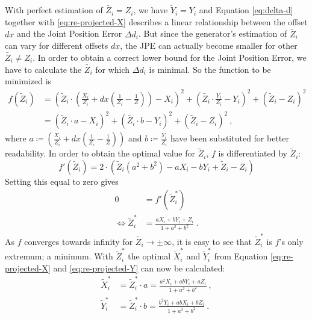 With perfect estimation of $\widetilde{Z_i} = Z_i$, we have $\widetilde{Y}_i = Y_i$ and Equation \eqref{eq:delta-d} together with \eqref{eq:re-projected-X} describes a linear relationship between the offset $dx$ and the Joint Position Error $\Delta d_i$.
But since the generator's estimation of $\widetilde{Z_i}$ can vary for different offsets $dx$, the JPE can actually become smaller for other $\widetilde{Z_i} \neq Z_i$. 
In order to obtain a correct lower bound for the Joint Position Error, we have to calculate the $\widetilde{Z_i}$ for which $\Delta d_i$ is minimal.
So the function to be minimized is
\begin{align}
	\label{eq:minimum-distance}
	f(\widetilde{Z}_i) &= \left ( \widetilde{Z}_i \cdot \left( \frac{X_i}{Z_i} + dx \left( \frac{1}{Z_i} - \frac{1}{Z} \right) \right ) - X_i \right)^2 + \left ( \widetilde{Z_i} \cdot \frac{Y_i}{Z_i} - Y_i \right )^2 + \left ( \widetilde{Z}_i - Z_i \right ) ^2 \\
	&= \left ( \widetilde{Z}_i \cdot a - X_i \right)^2 + \left ( \widetilde{Z_i} \cdot b - Y_i \right )^2 + \left ( \widetilde{Z}_i - Z_i \right )^2 \ ,
\end{align}
where $a \coloneqq \left( \frac{X_i}{Z_i} + dx \left( \frac{1}{Z_i} - \frac{1}{Z} \right) \right )$ and $b \coloneqq \frac{Y_i}{Z_i}$ have been substituted for better readability.
In order to obtain the optimal value for $\widetilde{Z}_i$, $f$ is differentiated by $\widetilde{Z}_i$:
\begin{equation}
	\label{eq:derivative-minimum-distance}
	f'(\widetilde{Z}_i) = 2 \cdot \left ( \widetilde{Z}_i \left (a^2 + b^2 \right ) - a X_i - b Y_i + \widetilde{Z}_i - Z_i \right )
\end{equation}
Setting this equal to zero gives
\begin{align}
	0 &= f'(\widetilde{Z}_i^\ast) \\
	\Leftrightarrow \widetilde{Z}_i^\ast & = \frac{a X_i + b Y_i + Z_i}{1 + a^2 + b^2} \ .
	\label{eq:z_i-min}
\end{align}
As $f$ converges towards infinity for $\widetilde{Z_i} \rightarrow \pm \infty$, it is easy to see that $\widetilde{Z}_i^\ast$ is $f$'s only extremum; a minimum.
With $\widetilde{Z}_i^\ast$ the optimal $\widetilde{X}_i^\ast$ and $\widetilde{Y}_i^\ast$ from Equation \eqref{eq:re-projected-X} and \eqref{eq:re-projected-Y} can now be calculated:
\begin{align}
	\label{eq:x_i-min}
	\widetilde{X}_i^\ast &= \widetilde{Z}_i^\ast \cdot a
	= \frac{a^2 X_i + a b Y_i +  a Z_i}{1 + a^2 + b^2} \ ,\\
	\label{eq:y_i-min}
	\widetilde{Y}_i^\ast &= \widetilde{Z}_i^\ast \cdot b
	= \frac{b^2 Y_i + a b X_i + b Z_i}{1 + a^2 + b^2} \ . 
\end{align}

